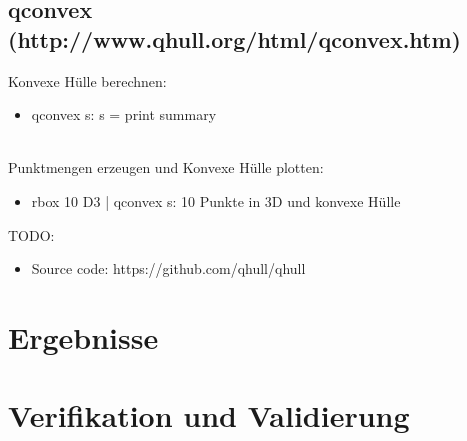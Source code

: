\documentclass[12pt]{scrartcl}
\begin{document}
\subsection{qconvex (http://www.qhull.org/html/qconvex.htm)}


Konvexe Hülle berechnen:

\begin{itemize}
    \item qconvex s: s = print summary
\end{itemize}
\ \\


Punktmengen erzeugen und Konvexe Hülle plotten:
\begin{itemize}
    \item rbox 10 D3 | qconvex s: 10 Punkte in 3D und konvexe Hülle
\end{itemize}


TODO:
\begin{itemize}
    \item Source code: https://github.com/qhull/qhull
\end{itemize}

\newpage

\section{Ergebnisse}


\section{Verifikation und Validierung}



\end{document}
